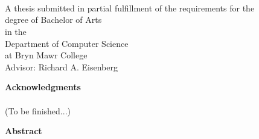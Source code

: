\documentclass[11pt, a4paper]{article} %
\theoremstyle{definition}
\newcommand\tab[1][1cm]{\hspace*{#1}}
\begin{document}



\begin{titlepage}
\begin{center}
\tab\\
\vspace{1.5cm}
\LARGE
{}\\

\Large
\vspace{1.5cm}
\\
\vspace{2cm}
\large
A thesis submitted in partial fulfillment of the requirements for the \\ degree of Bachelor of Arts \\ 
\vspace{0.5cm}
\large
in the \\ 
\vspace{0.5cm}
\large
Department of Computer Science \\ 
\vspace{0.5cm}
\large
at Bryn Mawr College \\
\vspace{1cm}
Advisor: Richard A. Eisenberg

\pagebreak

\end{center}
\Large
\textbf{Acknowledgments} 
\\\\
\small
(To be finished...)

\pagebreak
\begin{center}
\large
\textbf{Abstract}
\end{center}
\pagebreak

\end{titlepage}
\end{document}
